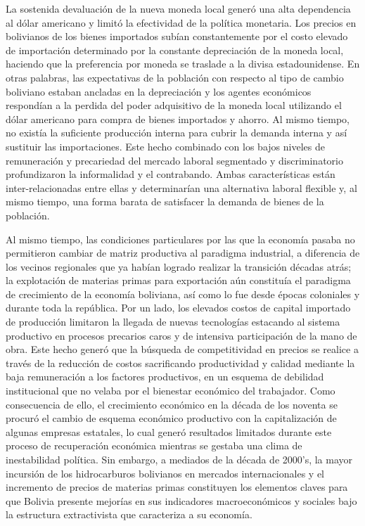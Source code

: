 \documentclass[12pt,letterpaper]{article}
\begin{document}
La sostenida devaluación de la nueva moneda local generó una alta dependencia al dólar americano y limitó la efectividad de la política monetaria. Los precios en bolivianos de los bienes importados subían constantemente por el costo elevado de importación determinado por la constante depreciación de la moneda local, haciendo que la preferencia por moneda se traslade a la divisa estadounidense. En otras palabras, las expectativas de la población con respecto al tipo de cambio boliviano estaban ancladas en la depreciación y los agentes económicos respondían a la perdida del poder adquisitivo de la moneda local utilizando el dólar americano para compra de bienes importados y ahorro. Al mismo tiempo, no existía la suficiente producción interna para cubrir la demanda interna y así sustituir las importaciones. Este hecho combinado con los bajos niveles de remuneración y precariedad del mercado laboral segmentado y discriminatorio profundizaron la informalidad y el contrabando. Ambas características están inter-relacionadas entre ellas y determinarían una alternativa laboral flexible y, al mismo tiempo, una forma barata de satisfacer la demanda de bienes de la población.

Al mismo tiempo, las condiciones particulares por las que la economía pasaba no permitieron cambiar de matriz productiva al paradigma industrial, a diferencia de los vecinos regionales que ya habían logrado realizar la transición décadas atrás; la explotación de materias primas para exportación aún constituía el paradigma de crecimiento de la economía boliviana, así como lo fue desde épocas coloniales y durante toda la república. Por un lado, los elevados costos de capital importado de producción limitaron la llegada de nuevas tecnologías estacando al sistema productivo en procesos precarios caros y de intensiva participación de la mano de obra. Este hecho generó que la búsqueda de competitividad en precios se realice a través de la reducción de costos sacrificando productividad y calidad mediante la baja remuneración a los factores productivos, en un esquema de debilidad institucional que no velaba por el bienestar económico del trabajador. Como consecuencia de ello, el crecimiento económico en la década de los noventa se procuró el cambio de esquema económico productivo con la capitalización de algunas empresas estatales, lo cual generó resultados limitados durante este proceso de recuperación económica mientras se gestaba una clima de inestabilidad política. Sin embargo, a mediados de la década de 2000's, la mayor incursión de los hidrocarburos bolivianos en mercados internacionales y el incremento de precios de materias primas constituyen los elementos claves para que Bolivia presente mejorías en sus indicadores macroeconómicos y sociales bajo la estructura extractivista que caracteriza a su economía.
\end{document}
